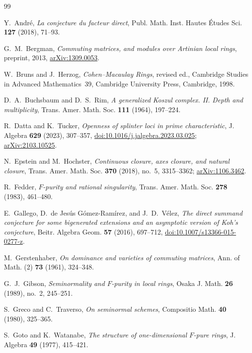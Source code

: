\begin{thebibliography}{99}

Y.~Andr\'e,
\emph{La conjecture du facteur direct},
Publ. Math. Inst. Hautes \'Etudes Sci. \textbf{127} (2018), 71--93.

G.~M.~Bergman,
\emph{Commuting matrices, and modules over Artinian local rings},
preprint, 2013,
\href{https://arxiv.org/abs/1309.0053}{arXiv:1309.0053}.

W.~Bruns and J.~Herzog,
\emph{Cohen--Macaulay Rings}, revised ed.,
Cambridge Studies in Advanced Mathematics~39,
Cambridge University Press, Cambridge, 1998.

D.~A.~Buchsbaum and D.~S.~Rim,
\emph{A generalized Koszul complex. II. Depth and multiplicity},
Trans. Amer. Math. Soc. \textbf{111} (1964), 197--224.

R.~Datta and K.~Tucker,
\emph{Openness of splinter loci in prime characteristic},
J. Algebra \textbf{629} (2023), 307--357,
\href{https://doi.org/10.1016/j.jalgebra.2023.03.025}{doi:10.1016/j.jalgebra.2023.03.025};
\href{https://arxiv.org/abs/2103.10525}{arXiv:2103.10525}.

N.~Epstein and M.~Hochster,
\emph{Continuous closure, axes closure, and natural closure},
Trans. Amer. Math. Soc. \textbf{370} (2018), no.~5, 3315--3362;
\href{https://arxiv.org/abs/1106.3462}{arXiv:1106.3462}.

R.~Fedder,
\emph{$F$-purity and rational singularity},
Trans. Amer. Math. Soc. \textbf{278} (1983), 461--480.

E.~Gallego, D.~de Jes\'us G\'omez-Ram\'irez, and J.~D.~V\'elez,
\emph{The direct summand conjecture for some bigenerated extensions and an
asymptotic version of Koh's conjecture},
Beitr. Algebra Geom. \textbf{57} (2016), 697--712,
\href{https://doi.org/10.1007/s13366-015-0277-z}{doi:10.1007/s13366-015-0277-z}.

M.~Gerstenhaber,
\emph{On dominance and varieties of commuting matrices},
Ann. of Math. (2) \textbf{73} (1961), 324--348.

G.~J.~Gibson,
\emph{Seminormality and $F$-purity in local rings},
Osaka J. Math. \textbf{26} (1989), no.~2, 245--251.

S.~Greco and C.~Traverso,
\emph{On seminormal schemes},
Compositio Math. \textbf{40} (1980), 325--365.

S.~Goto and K.~Watanabe,
\emph{The structure of one-dimensional $F$-pure rings},
J. Algebra \textbf{49} (1977), 415--421.


\end{thebibliography}
